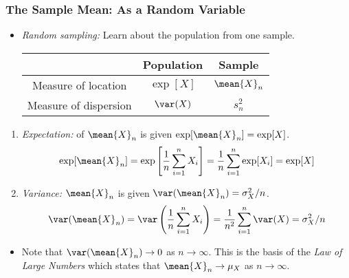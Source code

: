\begin{frame}
\frametitle{The Sample Mean: As a Random Variable} 
\begin{itemize}
\item \emph{Random sampling:} Learn about the population from one sample. 
\begin{table}
\centering
\begin{tabular}{ccc}
\toprule
& Population & Sample  \\
\midrule
Measure of location   & $\exp[X]$  & $\mean{X}_n$ \\
Measure of dispersion & $\var(X)$  & $s_n^2$ \\
\bottomrule
\end{tabular}
\end{table}
\end{itemize}
\begin{enumerate}
\item \emph{Expectation:} of $\mean{X}_n$ is given $\exp[\mean{X}_n] = \exp[X]$.
\begin{align*}
\exp[\mean{X}_n] 
    = \exp\left[\frac{1}{n}\sum_{i=1}^n X_i\right] 
    = \frac{1}{n}\sum_{i=1}^n \exp[X_i] 
    = \exp[X]
\end{align*} 
\item \emph{Variance:} $\mean{X}_n$ is given $\var(\mean{X}_n) = \sigma_X^2/n$.
\begin{align*}
\var(\mean{X}_n) 
    = \var\left(\frac{1}{n}\sum_{i=1}^n X_i\right) 
    = \frac{1}{n^2}\sum_{i=1}^n \var(X) 
    = \sigma_X^2/n
\end{align*} 
\end{enumerate}
\begin{itemize}
\item Note that $\var(\mean{X}_n)\to 0$ as $n\to\infty$. 
This is the basis of the \emph{Law of Large Numbers} which states that $\mean{X}_n \to \mu_X$ as $n\to\infty$.
\end{itemize}
\end{frame}


